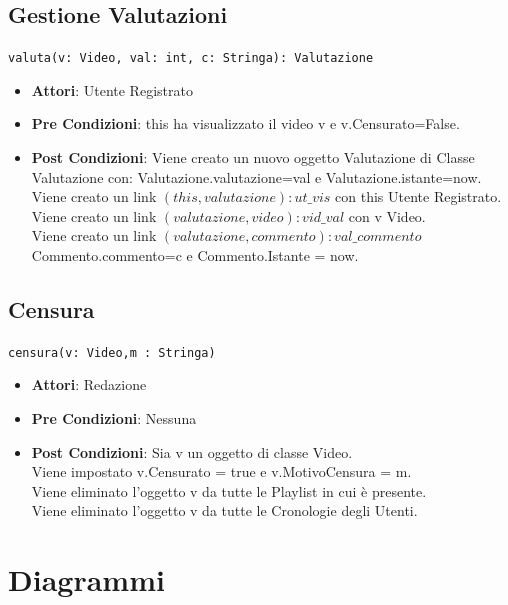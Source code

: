 \documentclass[12pt, letterpaper]{article}
\newcommand{\code}[1]{\colorbox{light-gray}{\texttt{#1}}}
\begin{document}
\subsection{Gestione Valutazioni}
\code{valuta(v: Video, val: int, c: Stringa): Valutazione}
\begin{itemize}
    \item \textbf{Attori}: Utente Registrato
    \item \textbf{Pre Condizioni}: this ha visualizzato il video v e v.Censurato=False.
    \item \textbf{Post Condizioni}: Viene creato un nuovo oggetto Valutazione di Classe Valutazione con: Valutazione.valutazione=val e Valutazione.istante=now.\\
    Viene creato un link $(this, valutazione): ut\_vis$ con this Utente Registrato.\\
    Viene creato un link $(valutazione, video): vid\_val$ con v Video.\\
    Viene creato un link $(valutazione, commento): val\_commento$ Commento.commento=c e Commento.Istante = now.
\end{itemize}
\subsection{Censura}
\code{censura(v: Video,m : Stringa)}
\begin{itemize} 
    \item \textbf{Attori}: Redazione
    \item \textbf{Pre Condizioni}: Nessuna
    \item \textbf{Post Condizioni}: Sia v un oggetto di classe Video.\\
    Viene impostato v.Censurato = true e v.MotivoCensura = m.\\
    Viene eliminato l'oggetto v da tutte le Playlist in cui è presente.\\
    Viene eliminato l'oggetto v da tutte le Cronologie degli Utenti.\\
\end{itemize}\newpage
\section{Diagrammi}
\end{document}

